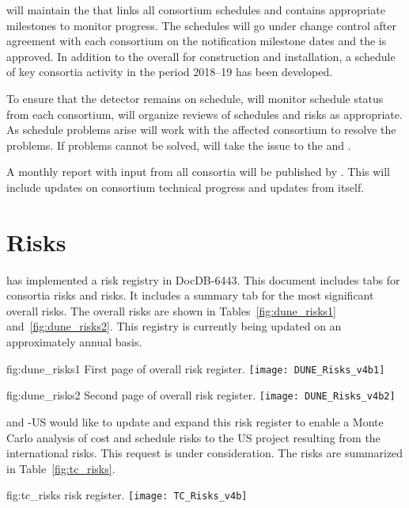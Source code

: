  will maintain the  that links all consortium schedules
and contains appropriate milestones to monitor progress.
The schedules will go under change control after agreement with each
consortium on the notification milestone dates and the  is
approved.
In addition to the overall  for construction and
installation, a schedule of key consortia activity in the period
2018--19  has been developed.

To ensure that the  detector remains on schedule,
 will monitor schedule status from each consortium, will organize
reviews of schedules and risks as appropriate.  As schedule problems
arise  will work with the affected consortium to resolve the
problems. If problems cannot be solved,  will take the issue to the
 and .

A monthly report with input from all consortia will be published by
. This will include updates on consortium technical progress and
updates from  itself.

\section{Risks}
\label{sec:fdsp-coord-risks}

 has implemented a risk registry in
DocDB-6443. This document includes tabs for consortia risks
and  risks. It includes a summary tab for the most significant overall
 risks. The overall  risks are shown in
Tables~\ref{fig:dune_risks1} and~\ref{fig:dune_risks2}. This registry
is currently being updated on an approximately annual basis.
\begin{dunefigure}{fig:dune_risks1}
  {First page of  overall risk register.}
  \texttt{[image: DUNE\_Risks\_v4b1]}
\end{dunefigure}
\begin{dunefigure}{fig:dune_risks2}
  {Second page of  overall risk register.}
  \texttt{[image: DUNE\_Risks\_v4b2]}
\end{dunefigure}
 and -US would like  to update and
expand this risk register to enable a Monte Carlo analysis of cost and
schedule risks to the US project resulting from the international
 risks. This request is under consideration.
The  risks are summarized in Table~\ref{fig:tc_risks}.
\begin{dunefigure}{fig:tc_risks}
  { risk register.}
  \texttt{[image: TC\_Risks\_v4b]}
\end{dunefigure}



